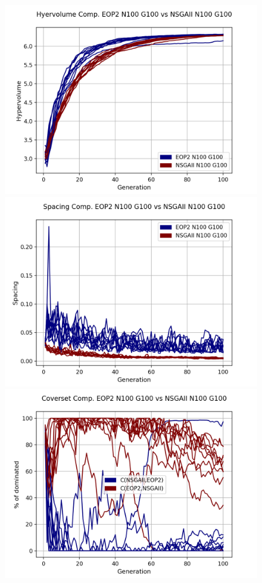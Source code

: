 \begin{figure}[H]
\includegraphics[scale=0.35]{../METRICS_PLOTS/Hypervol_COMP_EOP2N100G100_NSGAIIN100G100.png}
\includegraphics[scale=0.35]{../METRICS_PLOTS/Spacing_COMP_EOP2N100G100_NSGAIIN100G100.png}
\includegraphics[scale=0.35]{../METRICS_PLOTS/CoverSet_COMP_EOP2N100G100_NSGAIIN100G100.png}\\

\end{figure}
